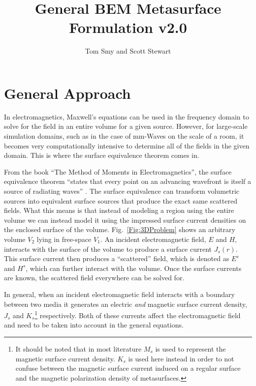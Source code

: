 \documentclass{article}
\title{General BEM Metasurface Formulation v2.0}
\author{Tom Smy and Scott Stewart}
\newcommand{\0}{\varnothing}
\begin{document}
\maketitle
\tableofcontents

\newpage

\section{General Approach}

In electromagnetics, Maxwell's equations can be used in the frequency domain to solve for the field in an entire volume for a given source. However, for large-scale simulation domains, such as in the case of mm-Waves on the scale of a room, it becomes very computationally intensive to determine all of the fields in the given domain. This is where the surface equivalence theorem comes in.

From the book ``The Method of Moments in Electromagnetics'', the surface equivalence theorem ``states that every point on an advancing wavefront is itself a source of radiating waves'' \cite{Method_Moments}. The surface equivalence can transform volumetric sources into equivalent surface sources that produce the exact same scattered fields. What this means is that instead of modeling a region using the entire volume we can instead model it using the impressed surface current densities on the enclosed surface of the volume.                                                                 
Fig.~\ref{Fig:3DProblem} shows an arbitrary volume $V_2$ lying in free-space $V_1$. An incident electromagnetic field, $E$ and $H$, interacts with the surface of the volume to produce a surface current $J_s(r)$. This surface current then produces a ``scattered'' field, which is denoted as $E^s$ and $H^s$, which can further interact with the volume. Once the surface currents are known, the scattered field everywhere can be solved for.


In general, when an incident electromagnetic field interacts with a boundary between two media it generates an electric \textit{and} magnetic surface current density, $J_s$ and $K_s$\footnote{It should be noted that in most literature $M_s$ is used to represent the magnetic surface current density. $K_s$ is used here instead in order to not confuse between the magnetic surface current induced on a regular surface and the magnetic polarization density of metasurfaces.} respectively. Both of these currents affect the electromagnetic field and need to be taken into account in the general equations. 
\end{document}
